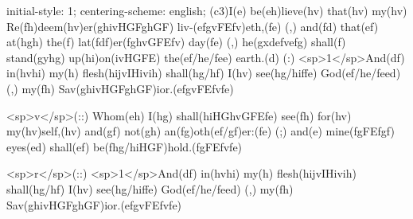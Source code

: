 initial-style: 1;
centering-scheme: english;
(c3)I(e) be(eh)lieve(hv) that(hv) my(hv) Re(fh)deem(hv)er(ghivHGFghGF) liv-(efgvFEfv)eth,(fe) (,) and(fd) that(ef) at(hgh) the(f) lat(fdf)er(fghvGFEfv) day(fe) (,) he(gxdefvefg) shall(f) stand(gyhg) up(hi)on(ivHGFE) the(ef/he/fee) earth.(d) (:) <sp>1</sp>And(df) in(hvhi) my(h) flesh(hijvIHivih) shall(hg/hf) I(hv) see(hg/hiffe) God(ef/he/feed) (,) my(fh) Sav(ghivHGFghGF)ior.(efgvFEfvfe)

<sp>v</sp>(::) Whom(eh) I(hg) shall(hiHGhvGFEfe) see(fh) for(hv) my(hv)self,(hv) and(gf) not(gh) an(fg)oth(ef/gf)er:(fe) (;) and(e) mine(fgFEfgf) eyes(ed) shall(ef) be(fhg/hiHGF)hold.(fgFEfvfe)

<sp>r</sp>(::) <sp>1</sp>And(df) in(hvhi) my(h) flesh(hijvIHivih) shall(hg/hf) I(hv) see(hg/hiffe) God(ef/he/feed) (,) my(fh) Sav(ghivHGFghGF)ior.(efgvFEfvfe)